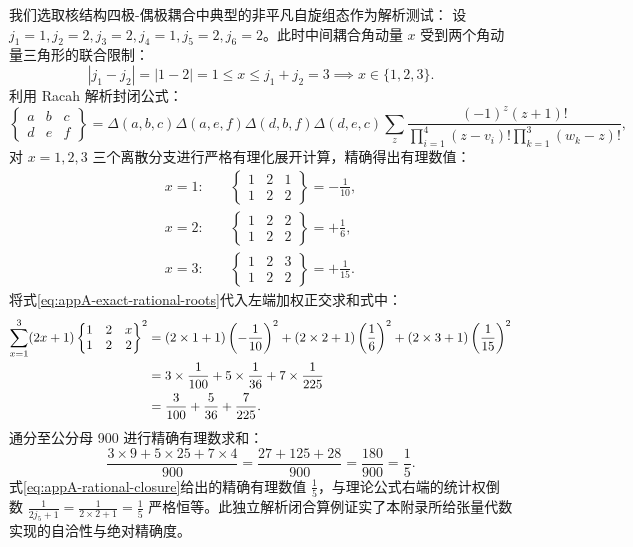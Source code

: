 我们选取核结构四极-偶极耦合中典型的非平凡自旋组态作为解析测试：
设 $j_1 = 1, j_2 = 2, j_3 = 2, j_4 = 1, j_5 = 2, j_6 = 2$。此时中间耦合角动量 $x$ 受到两个角动量三角形的联合限制：
\begin{equation}
|j_1 - j_2| = |1 - 2| = 1 \le x \le j_1 + j_2 = 3 \implies x \in \{1, 2, 3\} .
\end{equation}
利用 Racah 解析封闭公式：
\begin{equation}\label{eq:appA-racah-formula}
\begin{Bmatrix} a & b & c \\ d & e & f \end{Bmatrix} = \Delta(a,b,c) \Delta(a,e,f) \Delta(d,b,f) \Delta(d,e,c) \sum_z \frac{(-1)^z (z+1)!}{\prod_{i=1}^4 (z - v_i)! \prod_{k=1}^3 (w_k - z)!} ,
\end{equation}
对 $x=1, 2, 3$ 三个离散分支进行严格有理化展开计算，精确得出有理数值：
\begin{align}\label{eq:appA-exact-rational-roots}
x=1: \quad &\begin{Bmatrix} 1 & 2 & 1 \\ 1 & 2 & 2 \end{Bmatrix} = -\frac{1}{10} , \\
x=2: \quad &\begin{Bmatrix} 1 & 2 & 2 \\ 1 & 2 & 2 \end{Bmatrix} = +\frac{1}{6} , \\
x=3: \quad &\begin{Bmatrix} 1 & 2 & 3 \\ 1 & 2 & 2 \end{Bmatrix} = +\frac{1}{15} .
\end{align}
将式\eqref{eq:appA-exact-rational-roots}代入左端加权正交求和式中：
\begin{align}\label{eq:appA-rational-verification}
\sum_{x=1}^3 (2x + 1) \begin{Bmatrix} 1 & 2 & x \\ 1 & 2 & 2 \end{Bmatrix}^2 &= (2\times 1 + 1) \left(-\frac{1}{10}\right)^2 + (2\times 2 + 1) \left(\frac{1}{6}\right)^2 + (2\times 3 + 1) \left(\frac{1}{15}\right)^2 \notag \\
&= 3 \times \frac{1}{100} + 5 \times \frac{1}{36} + 7 \times \frac{1}{225} \notag \\
&= \frac{3}{100} + \frac{5}{36} + \frac{7}{225} .
\end{align}
通分至公分母 900 进行精确有理数求和：
\begin{equation}\label{eq:appA-rational-closure}
\frac{3 \times 9 + 5 \times 25 + 7 \times 4}{900} = \frac{27 + 125 + 28}{900} = \frac{180}{900} = \frac{1}{5} .
\end{equation}
式\eqref{eq:appA-rational-closure}给出的精确有理数值 $\frac{1}{5}$，与理论公式右端的统计权倒数 $\frac{1}{2j_5 + 1} = \frac{1}{2\times 2 + 1} = \frac{1}{5}$ 严格恒等。此独立解析闭合算例证实了本附录所给张量代数实现的自洽性与绝对精确度。

